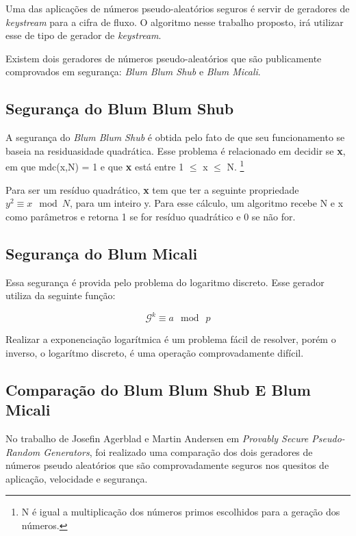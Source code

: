 Uma das aplicações de números pseudo-aleatórios seguros é servir de geradores de \textit{keystream} para a cifra de fluxo. O algoritmo nesse trabalho proposto, irá utilizar esse de tipo de gerador de \textit{keystream}.

Existem dois geradores de números pseudo-aleatórios que são publicamente comprovados em segurança: \textit{Blum Blum Shub} e \textit{Blum Micali}.

\subsection{Segurança do Blum Blum Shub}

A segurança do \textit{Blum Blum Shub} é obtida pelo fato de que seu funcionamento se baseia na residuasidade quadrática. Esse problema é relacionado em decidir se \textbf{x}, em que mdc(x,N) = 1 e que \textbf{x} está entre 1 $\le$  x $\le$ N. \footnote{N é igual a multiplicação dos números primos escolhidos para a geração dos números.}

Para ser um resíduo quadrático, \textbf{x} tem que ter a seguinte propriedade $y ^ 2 \equiv x \: \bmod N$, para um inteiro y. Para esse cálculo, um algoritmo recebe N e x como parâmetros e retorna 1 se for resíduo quadrático e 0 se não for.~\cite{josefin-martin}

\subsection{Segurança do Blum Micali}

Essa segurança é provida pelo problema do logaritmo discreto. Esse gerador utiliza da seguinte função:

\begin{equation}
	\mathcal{G}^k \equiv a \: \bmod \: p 
\end{equation}

Realizar a exponenciação logarítmica é um problema fácil de resolver, porém o inverso, o logarítmo discreto, é uma operação comprovadamente difícil.

\subsection{Comparação do Blum Blum Shub E Blum Micali}

No trabalho de Josefin Agerblad e  Martin Andersen em \textit{Provably Secure Pseudo-Random Generators}, foi realizado uma comparação dos dois geradores de números pseudo aleatórios que são comprovadamente seguros nos quesitos de aplicação, velocidade e segurança.


